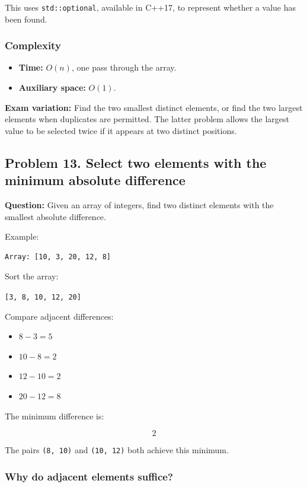 This uses \texttt{std::optional}, available in C++17, to represent whether a value has been found.

\subsubsection{Complexity}

\begin{itemize}
    \item \textbf{Time:} $O(n)$, one pass through the array.
    \item \textbf{Auxiliary space:} $O(1)$.
\end{itemize}

\textbf{Exam variation:} Find the two smallest distinct elements, or find the two largest elements when duplicates are permitted. The latter problem allows the largest value to be selected twice if it appears at two distinct positions.

\subsection{Problem 13. Select two elements with the minimum absolute difference}

\textbf{Question:} Given an array of integers, find two distinct elements with the smallest absolute difference.

Example:

\begin{lstlisting}[style=pseudocode]
Array: [10, 3, 20, 12, 8]
\end{lstlisting}

Sort the array:

\texttt{[3, 8, 10, 12, 20]}

Compare adjacent differences:

\begin{itemize}
    \item $8-3=5$
    \item $10-8=2$
    \item $12-10=2$
    \item $20-12=8$
\end{itemize}

The minimum difference is:


\[
\boxed{2}
\]


The pairs \texttt{(8, 10)} and \texttt{(10, 12)} both achieve this minimum.

\subsubsection{Why do adjacent elements suffice?}

